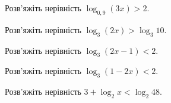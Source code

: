 \documentclass[12pt]{article}
\begin{document}
\begin{samepage}
\noindent\zadnum Розв'яжіть нерівність $\log_{0,9} (3x) > 2$. \par
\nopagebreak\nbvspace{0.3cm}

\nmtnobreak
{}
\par{}
\end{samepage}

\begin{samepage}
\noindent\zadnum Розв'яжіть нерівність $\log_3 (2x) > \log_3 10$. \par
\nopagebreak\nbvspace{0.3cm}

\nmtnobreak
{}
\nopagebreak\nbvspace{0.5cm}

\nmtnobreak
\par{}\vspace{0.25cm}
\end{samepage}

\begin{samepage}
\noindent\zadnum Розв'яжіть нерівність $\log_3 (2x - 1) < 2$. \par
\nopagebreak\nbvspace{0.3cm}

\nmtnobreak
{}
\par{}
\end{samepage}

\begin{samepage}
\noindent\zadnum Розв'яжіть нерівність $\log_3 (1 - 2x) < 2$. \par
\nopagebreak\nbvspace{0.3cm}

\nmtnobreak
{}
\par{}
\end{samepage}

\begin{samepage}
\noindent\zadnum Розв'яжіть нерівність $3 + \log_2 x < \log_2 48$. \par
\nopagebreak\nbvspace{0.3cm}

\nmtnobreak
{}
\par{}
\end{samepage}
\end{document}
